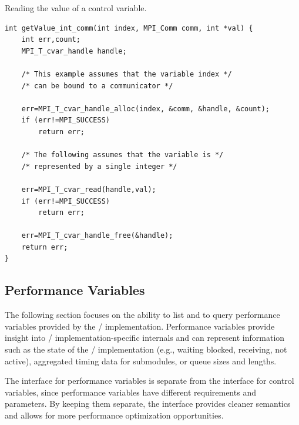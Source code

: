 \begin{example}
%
%
Reading the value of a control variable.

\begin{lstlisting}[language={[MPI]C}]
int getValue_int_comm(int index, MPI_Comm comm, int *val) {
    int err,count;
    MPI_T_cvar_handle handle;

    /* This example assumes that the variable index */
    /* can be bound to a communicator */

    err=MPI_T_cvar_handle_alloc(index, &comm, &handle, &count);
    if (err!=MPI_SUCCESS)
        return err;

    /* The following assumes that the variable is */
    /* represented by a single integer */

    err=MPI_T_cvar_read(handle,val);
    if (err!=MPI_SUCCESS)
        return err;

    err=MPI_T_cvar_handle_free(&handle);
    return err;
}
\end{lstlisting}
\end{example}


\subsection{Performance Variables}
\label{sec:mpit:pvar}

The following section focuses on the ability to list and to query
performance variables provided by the \MPI/ implementation.  Performance
variables provide insight into \MPI/ implementation-specific internals and
can represent information such as the state of the \MPI/ implementation
(e.g., waiting blocked, receiving, not active), aggregated timing data for
submodules, or queue sizes and lengths.


\begin{rationale}
The interface for performance variables is separate from the interface for
control variables, since performance variables have different requirements
and parameters.  By keeping them separate, the interface provides cleaner
semantics and allows for more performance optimization opportunities.
\end{rationale}

